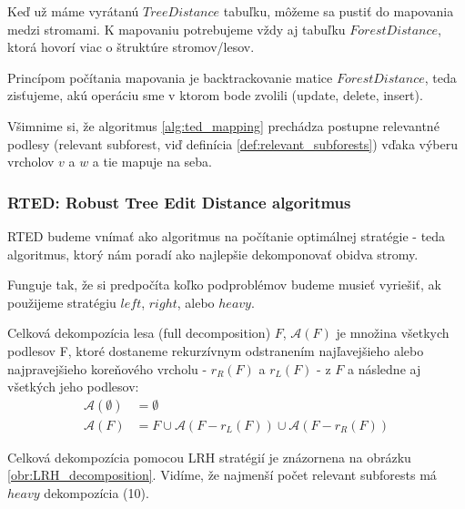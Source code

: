 Keď už máme vyrátanú $TreeDistance$ tabuľku, môžeme sa pustiť do mapovania medzi
stromami. K mapovaniu potrebujeme vždy aj tabuľku $ForestDistance$, ktorá hovorí
viac o štruktúre stromov/lesov.



Princípom počítania mapovania je backtrackovanie matice $ForestDistance$, teda
zisťujeme, akú operáciu sme v ktorom bode zvolili (update, delete, insert).

Všimnime si, že algoritmus \ref{alg:ted_mapping} prechádza postupne
relevantné podlesy (relevant subforest, viď definícia \ref{def:relevant_subforests})
vďaka výberu vrcholov $v$ a $w$ a tie mapuje na seba.






\subsubsection{RTED: Robust Tree Edit Distance algoritmus}

RTED budeme vnímať ako algoritmus na počítanie optimálnej stratégie - teda algoritmus,
ktorý nám poradí ako najlepšie dekomponovať obidva stromy.

Funguje tak, že si predpočíta koľko podproblémov budeme musieť vyriešiť, ak použijeme stratégiu
$left$, $right$, alebo $heavy$.

\begin{definice}
	Celková dekompozícia lesa (full decomposition) $F$, $\mathcal{A}(F)$ je množina
	všetkych podlesov F, ktoré dostaneme rekurzívnym odstranením najľavejšieho
	alebo najpravejšieho koreňového vrcholu - $r_{R}(F)$ a $r_{L}(F)$ - z $F$
	a následne aj všetkých jeho podlesov:
	\begin{align*}
		\mathcal{A}(\emptyset) &= \emptyset
		\\
		\mathcal{A}(F) &= {F} \cup \mathcal{A}(F - r_{L}(F)) \cup \mathcal{A}(F - r_{R}(F))
	\end{align*}
\end{definice}

Celková dekompozícia pomocou LRH stratégií je znázornena na obrázku \ref{obr:LRH_decomposition}.
Vidíme, že najmenší počet relevant subforests má $heavy$ dekompozícia (10).

